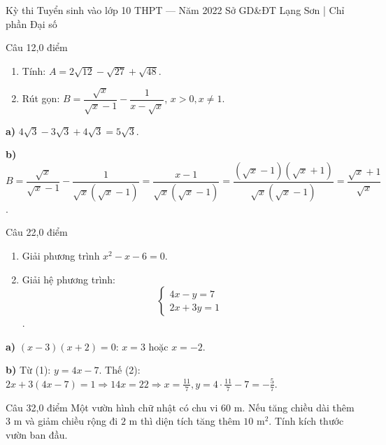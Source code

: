 ﻿%
%
  {Kỳ thi Tuyển sinh vào lớp 10 THPT — Năm 2022}%
  {Sở GD\&ĐT Lạng Sơn | Chỉ phần Đại số}

\begin{de_cau}{Câu 1}{2,0 điểm}
\begin{enumerate}[label=\alph*)]
\item Tính: $A = 2\sqrt{12} - \sqrt{27} + \sqrt{48}$.
\item Rút gọn: $B = \dfrac{\sqrt{x}}{\sqrt{x}-1} - \dfrac{1}{x-\sqrt{x}}$, $x>0, x\neq 1$.
\end{enumerate}
\end{de_cau}

\begin{loi_giai_cau}
\textbf{a)} $4\sqrt{3}-3\sqrt{3}+4\sqrt{3}=5\sqrt{3}$.

\textbf{b)} $B=\dfrac{\sqrt{x}}{\sqrt{x}-1}-\dfrac{1}{\sqrt{x}(\sqrt{x}-1)}=\dfrac{x-1}{\sqrt{x}(\sqrt{x}-1)}=\dfrac{(\sqrt{x}-1)(\sqrt{x}+1)}{\sqrt{x}(\sqrt{x}-1)}=\dfrac{\sqrt{x}+1}{\sqrt{x}}$.
\end{loi_giai_cau}

\begin{de_cau}{Câu 2}{2,0 điểm}
\begin{enumerate}[label=\alph*)]
\item Giải phương trình $x^2-x-6=0$.
\item Giải hệ phương trình: 
\[ \begin{cases}4x-y=7\\2x+3y=1\end{cases} \].
\end{enumerate}
\end{de_cau}

\begin{loi_giai_cau}
\textbf{a)} $(x-3)(x+2)=0$: $x=3$ hoặc $x=-2$.

\textbf{b)} Từ (1): $y=4x-7$. Thế (2): $2x+3(4x-7)=1\Rightarrow 14x=22\Rightarrow x=\frac{11}{7}, y=4\cdot\frac{11}{7}-7=-\frac{5}{7}$.
\end{loi_giai_cau}

\begin{de_cau}{Câu 3}{2,0 điểm}
Một vườn hình chữ nhật có chu vi $60\text{ m}$. Nếu tăng chiều dài thêm $3\text{ m}$ và giảm chiều rộng đi $2\text{ m}$ thì
diện tích tăng thêm $10\text{ m}^2$. Tính kích thước vườn ban đầu.
\end{de_cau}


